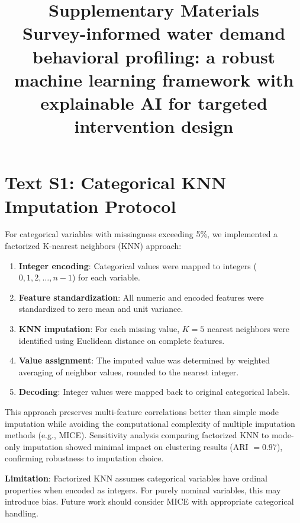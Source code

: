 \documentclass[a4paper,12pt]{article}
\title{\textbf{Supplementary Materials}\\[0.5cm]
Survey-informed water demand behavioral profiling: a robust machine learning framework with explainable AI for targeted intervention design}
\author{}
\date{}
\begin{document}
\maketitle

\tableofcontents
\newpage

\section{Text S1: Categorical KNN Imputation Protocol}

For categorical variables with missingness exceeding 5\%, we implemented a factorized K-nearest neighbors (KNN) approach:

\begin{enumerate}
    \item \textbf{Integer encoding}: Categorical values were mapped to integers ($0, 1, 2, \ldots, n-1$) for each variable.
    \item \textbf{Feature standardization}: All numeric and encoded features were standardized to zero mean and unit variance.
    \item \textbf{KNN imputation}: For each missing value, $K=5$ nearest neighbors were identified using Euclidean distance on complete features.
    \item \textbf{Value assignment}: The imputed value was determined by weighted averaging of neighbor values, rounded to the nearest integer.
    \item \textbf{Decoding}: Integer values were mapped back to original categorical labels.
\end{enumerate}

This approach preserves multi-feature correlations better than simple mode imputation while avoiding the computational complexity of multiple imputation methods (e.g., MICE). Sensitivity analysis comparing factorized KNN to mode-only imputation showed minimal impact on clustering results (ARI $= 0.97$), confirming robustness to imputation choice.

\textbf{Limitation}: Factorized KNN assumes categorical variables have ordinal properties when encoded as integers. For purely nominal variables, this may introduce bias. Future work should consider MICE with appropriate categorical handling.

\end{document}

